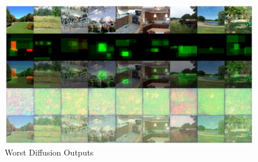 \documentclass{UoYCSproject}
\begin{document}
\begin{figure}[ht]
    \centering
    \includegraphics[width=\linewidth]{Worst Diffusion Outputs}
    \caption{Worst Diffusion Outputs}
    \label{fig:DiffusionWorstOutput}
\end{figure}

\printbibliography
\end{document}
